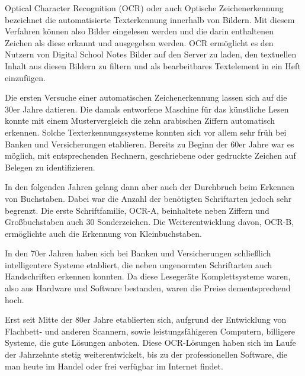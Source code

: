 
Optical Character Recognition (OCR) oder auch Optische Zeichenerkennung bezeichnet die automatisierte Texterkennung innerhalb von Bildern. Mit diesem Verfahren können also Bilder eingelesen werden und die darin enthaltenen Zeichen als diese erkannt und ausgegeben werden. OCR ermöglicht es den Nutzern von Digital School Notes Bilder auf den Server zu laden, den textuellen Inhalt aus diesen Bildern zu filtern und als bearbeitbares Textelement in ein Heft einzufügen.


Die ersten Versuche einer automatischen Zeichenerkennung lassen sich auf die 30er Jahre datieren. Die damals entworfene Maschine für das künstliche Lesen konnte mit einem Mustervergleich die zehn arabischen Ziffern automatisch erkennen. Solche Texterkennungssysteme konnten sich vor allem sehr früh bei Banken und Versicherungen etablieren. Bereits zu Beginn der 60er Jahre war es möglich, mit entsprechenden Rechnern, geschriebene oder gedruckte Zeichen auf Belegen zu identifizieren. \cite{OCRB}

In den folgenden Jahren gelang dann aber auch der Durchbruch beim Erkennen von Buchstaben. Dabei war die Anzahl der benötigten Schriftarten jedoch sehr begrenzt. Die erste Schriftfamilie, OCR-A, beinhaltete neben Ziffern und Großbuchstaben auch 30 Sonderzeichen. Die Weiterentwicklung davon, OCR-B, ermöglichte auch die Erkennung von Kleinbuchstaben. \cite{OCRB}

In den 70er Jahren haben sich bei Banken und Versicherungen schließlich intelligentere Systeme etabliert, die neben ungenormten Schriftarten auch Handschriften erkennen konnten. Da diese Lesegeräte Komplettsysteme waren, also aus Hardware und Software bestanden, waren die Preise dementsprechend hoch. \cite{OCRB}

Erst seit Mitte der 80er Jahre etablierten sich, aufgrund der Entwicklung von Flachbett- und anderen Scannern, sowie leistungsfähigeren Computern, billigere Systeme, die gute Lösungen anboten. Diese OCR-Lösungen haben sich im Laufe der Jahrzehnte stetig weiterentwickelt, bis zu der professionellen Software, die man heute im Handel oder frei verfügbar im Internet findet. \cite{OCRB}

